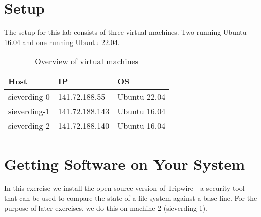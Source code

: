
\section{Setup}

The setup for this lab consists of three virtual machines.
Two running Ubuntu 16.04 and one running Ubuntu 22.04.

\begin{table}[H]
  \centering
  \begin{tabular}{|l|l|l|}
    \hline
    \textbf{Host} & \textbf{IP}    & \textbf{OS}  \\
    \hline
    sieverding-0  & 141.72.188.55  & Ubuntu 22.04 \\
    \hline
    sieverding-1  & 141.72.188.143 & Ubuntu 16.04 \\
    \hline
    sieverding-2  & 141.72.188.140 & Ubuntu 16.04 \\
    \hline
  \end{tabular}
  \caption{Overview of virtual machines}
\end{table}

\section{Getting Software on Your System}\label{sec:installation}

In this exercise we install the open source version of Tripwire---a security tool that can be used to compare the state of a file system against a base line.
For the purpose of later exercises, we do this on machine 2 (sieverding-1).

